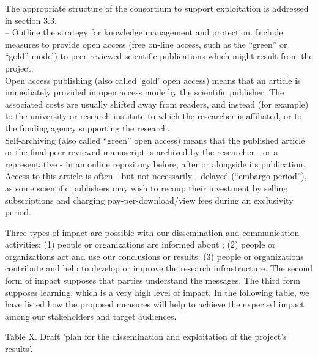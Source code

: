 {The appropriate structure of the consortium to support exploitation is addressed
in section 3.3. \\
-- Outline the strategy for knowledge management and protection. Include measures to
provide open access (free on-line access, such as the ``green'' or ``gold'' model) to
peer-reviewed scientific publications which might result from the project.\\
Open access publishing (also called 'gold' open access) means that an article is
immediately provided in open access mode by the scientific publisher. The associated costs
are usually shifted away from readers, and instead (for example) to the university or
research institute to which the researcher is affiliated, or to the funding agency supporting
the research.\\
Self-archiving (also called ``green'' open access) means that the published article or the
final peer-reviewed manuscript is archived by the researcher - or a representative - in an
online repository before, after or alongside its publication. Access to this article is often -
but not necessarily - delayed (``embargo period''), as some scientific publishers may wish to
recoup their investment by selling subscriptions and charging pay-per-download/view fees
during an exclusivity period.}

Three types of impact are possible with our dissemination and
communication activities: (1) people or organizations are informed
about \TheProject; (2) people or organizations act and use our conclusions
or results; (3) people or organizations contribute and help to develop
or improve the research infrastructure. The second form of impact
supposes that parties understand the messages. The third form supposes
learning, which is a very high level of impact. In the following table,
we have listed how the proposed measures will help to achieve the
expected impact among our stakeholders and target audiences.

Table X.  Draft 'plan for the dissemination and exploitation of the
project's results'.

